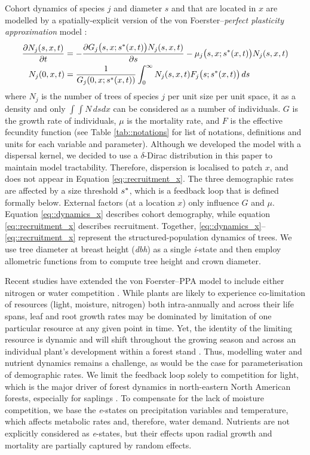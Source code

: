 Cohort dynamics of species $ j $ and diameter $ s $ and that are located in $ x $ are modelled by a spatially-explicit version of the von Foerster--\textit{perfect plasticity approximation} model \citep[hereafter, von Foerster--PPA]{Strigul2008}:
\begin{align}
	\frac{\partial N_j(s, x, t)}{\partial t} &= - \frac{\partial G_j \big(s, x; {s}^{*}(x, t) \big) N_j(s, x, t)}{\partial s} - \mu_j\big(s, x; {s}^{*}(x, t) \big) N_j(s, x, t) \label{eq::dynamics_x} \\
	N_j(0, x, t) &= \frac{1}{G_j(0, x; {s}^{*}(x, t))} \int_0^{\infty} N_j(s, x, t) F_j\big(s; {s}^{*}(x, t) \big) \, ds \label{eq::recruitment_x}
\end{align}
where $ N_j $ is the number of trees of species $ j $ per unit size per unit space, it as a density and only $ \int \int N \, ds dx $ can be considered as a number of individuals. $ G $ is the growth rate of individuals, $ \mu $ is the mortality rate, and $ F $ is the effective fecundity function (see Table \ref{tab::notations} for list of notations, definitions and units for each variable and parameter). Although we developed the model with a dispersal kernel, we decided to use a $ \delta $-Dirac distribution in this paper to maintain model tractability. Therefore, dispersion is localised to patch $ x $, and does not appear in Equation \eqref{eq::recruitment_x}. The three demographic rates are affected by a size threshold $ {s}^{*} $, which is a feedback loop that is defined formally below. External factors (at a location $ x $) only influence $ G $ and $ \mu $. Equation \eqref{eq::dynamics_x} describes cohort demography, while equation \eqref{eq::recruitment_x} describes recruitment. Together, \eqref{eq::dynamics_x}--\eqref{eq::recruitment_x} represent the structured-population dynamics of trees. We use tree diameter at breast height (\textit{\textit{dbh}}) as a single \textit{i}-state and then employ allometric functions from \citet{Purves2007} to compute tree height and crown diameter.

Recent studies have extended the von Foerster--PPA model to include either nitrogen or water competition \citep{Dybzinski2011, Farrior2013}. While plants are likely to experience co-limitation of resources (\eg light, moisture, nitrogen) both intra-annually and across their life spans, leaf and root growth rates may be dominated by limitation of one particular resource at any given point in time. Yet, the identity of the limiting resource is dynamic and will shift throughout the growing season and across an individual plant's development within a forest stand \citep{Farrior2013}. Thus, modelling water and nutrient dynamics remains a challenge, as would be the case for parameterisation of demographic rates. We limit the feedback loop solely to competition for light, which is the major driver of forest dynamics in north-eastern North American forests, especially for saplings \citep{Pacala1996, Kobe2006, Purves2007}. To compensate for the lack of moisture competition, we base the \textit{e}-states on precipitation variables and temperature, which affects metabolic rates \citep{Brown2004} and, therefore, water demand. Nutrients are not explicitly considered as \textit{e}-states, but their effects upon radial growth and mortality are partially captured by random effects.

